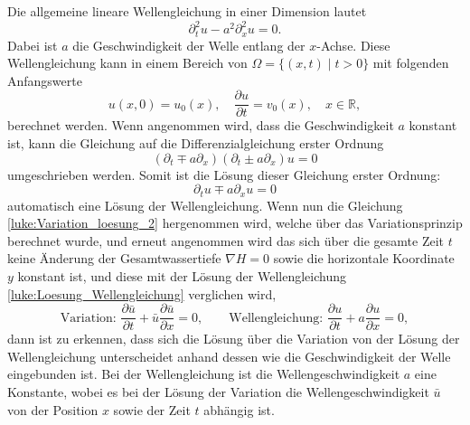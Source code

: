 Die allgemeine lineare Wellengleichung in einer Dimension lautet
\[
\partial_t^2 u - a^2 \partial_x^2 u  = 0.
\]
Dabei ist $a$ die Geschwindigkeit der Welle entlang der $x$-Achse.
Diese Wellengleichung kann in einem Bereich von $\Omega = \{(x,t)\mid t >0\}$ mit folgenden Anfangswerte
\[
u(x,0) = u_0(x),\quad \frac{\partial u}{\partial t} = v_0(x),\quad x \in \mathbb{R},
\]
berechnet werden.
Wenn angenommen wird, dass die Geschwindigkeit $a$ konstant ist, kann die Gleichung auf die Differenzialgleichung erster Ordnung
\[
(\partial_t\mp a\partial_x)(\partial_t\pm a\partial_x) u  = 0
\]
 umgeschrieben werden.
Somit ist die Lösung dieser Gleichung erster Ordnung:
\begin{equation}
	\partial_t u \mp a\partial_x u = 0
	\label{luke:Loesung_Wellengleichung}
\end{equation}
automatisch eine Lösung der Wellengleichung.
Wenn nun die Gleichung \eqref{luke:Variation_loesung_2} hergenommen wird, welche über das Variationsprinzip berechnet wurde, und erneut angenommen wird das sich über die gesamte Zeit $t$ keine Änderung der Gesamtwassertiefe $ \nabla H = 0 $ sowie die horizontale Koordinate $y$ konstant ist, und diese mit der Lösung der Wellengleichung \eqref{luke:Loesung_Wellengleichung} verglichen wird,
\[
\text{Variation: }\frac{\partial \bar{u}}{\partial t} + \bar{u} \frac{\partial \bar{u}}{\partial x} = 0,
\qquad
\text{Wellengleichung: }\frac{\partial u}{\partial t} + a \frac{\partial u}{\partial x} = 0,
\]
dann ist zu erkennen, dass sich die Lösung über die Variation von der Lösung der Wellengleichung unterscheidet anhand dessen wie die Geschwindigkeit der Welle eingebunden ist.
Bei der Wellengleichung ist die Wellengeschwindigkeit $a$ eine Konstante, wobei es bei der Lösung der Variation die Wellengeschwindigkeit $\bar{u}$ von der Position $x$ sowie der Zeit $t$ abhängig ist.

